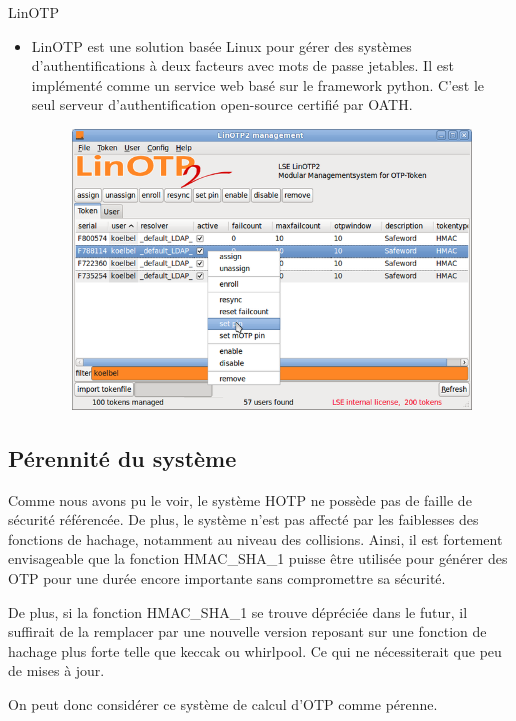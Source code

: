 \documentclass{../res/univ-projet}
\begin{document}
  LinOTP
  \begin{itemize}
    \item LinOTP est une solution basée Linux pour gérer des systèmes d'authentifications à deux facteurs avec mots de passe jetables.
          Il est implémenté comme un service web basé sur le framework python. C'est le seul serveur d'authentification open-source certifié par OATH.
          \begin{figure}[h!]
            \centerline{\includegraphics[scale=0.4]{linOTP.png}}
          \end{figure}
  \end{itemize}  
  
  \subsection{Pérennité du système}
    Comme nous avons pu le voir, le système HOTP ne possède pas de faille de sécurité référencée. De plus, le système n'est pas affecté par les faiblesses des fonctions de 
    hachage, notamment au niveau des collisions. Ainsi, il est fortement envisageable que la fonction HMAC\_SHA\_1 puisse être utilisée pour générer des OTP pour une durée
    encore importante sans compromettre sa sécurité.
    
    De plus, si la fonction HMAC\_SHA\_1 se trouve dépréciée dans le futur, il suffirait de la remplacer par une nouvelle version reposant sur une fonction de hachage plus 
    forte telle que keccak ou whirlpool. Ce qui ne nécessiterait que peu de mises à jour.
    
    On peut donc considérer ce système de calcul d'OTP comme pérenne.
    
\end{document}
